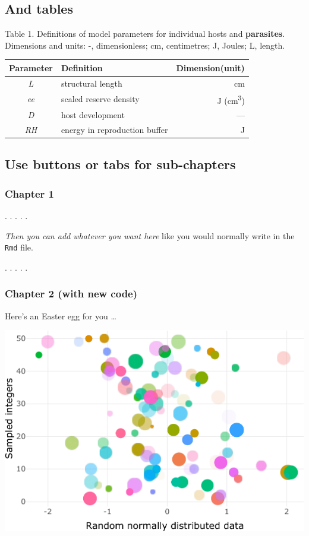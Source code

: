 \documentclass[article]{article}
\begin{document}
\newpage

\subsection{And tables}\label{and-tables}

Table 1. Definitions of model parameters for individual hosts and
\textbf{parasites}. Dimensions and units: -, dimensionless; cm,
centimetres; J, Joules; L, length.

\begin{longtable}[]{@{}clr@{}}
\toprule
Parameter & Definition & Dimension(unit)\tabularnewline
\midrule
\endhead
\emph{L} & structural length & cm\tabularnewline
\emph{ee} & scaled reserve density & J
(cm\textsuperscript{3})\tabularnewline
\emph{D} & host development & ---\tabularnewline
\emph{RH} & energy in reproduction buffer & J\tabularnewline
\bottomrule
\end{longtable}

\newpage

\subsection{Use buttons or tabs for
sub-chapters}\label{use-buttons-or-tabs-for-sub-chapters}

\subsubsection{Chapter 1}\label{chapter-1}

. . . . .

\emph{Then you can add whatever you want here} like you would normally
write in the \texttt{Rmd} file.

. . . . .

\subsubsection{Chapter 2 (with new code)}\label{chapter-2-with-new-code}

Here's an Easter egg for you \ldots{}

\includegraphics{Lesson5_rmd_files/figure-latex/unnamed-chunk-4-1.pdf}
\end{document}
